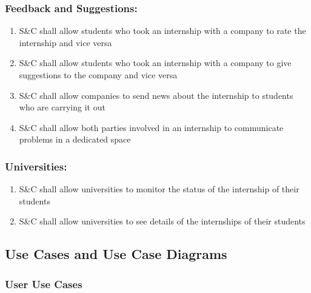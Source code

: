     \subsubsection*{Feedback and Suggestions:}
        \begin{enumerate}[label=\textbf{R\arabic*},resume]
            \item S\&C shall allow students who took an internship with a company to rate the internship and vice versa
            \item S\&C shall allow students who took an internship with a company to give suggestions to the company and vice versa
            \item S\&C shall allow companies to send news about the internship to students who are carrying it out
            \item S\&C shall allow both parties involved in an internship to communicate problems in a dedicated space
        \end{enumerate}
        \subsubsection*{Universities:}
        \begin{enumerate}[label=\textbf{R\arabic*},resume]
            \item S\&C shall allow universities to monitor the status of the internship of their students
            \item S\&C shall allow universities to see details of the internships of their students
        \end{enumerate}
        
\newpage

\subsection{Use Cases and Use Case Diagrams}

    \subsubsection{User Use Cases}
    

